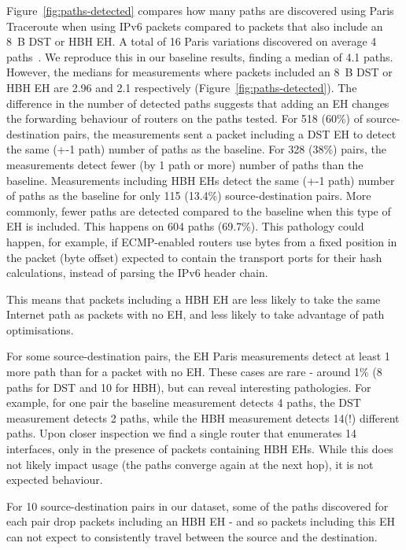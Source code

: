 \documentclass[conference]{IEEEtran}
\begin{document}
Figure~\ref{fig:paths-detected} compares how many paths are discovered using Paris Traceroute when using IPv6 packets compared to packets that also include an 8~B DST or HBH EH.
A total of 16 Paris variations discovered on average 4 paths~\cite{augustin2006avoiding}. We reproduce this in our baseline results, finding a median of 4.1 paths. However, the medians for measurements where packets included an 8~B DST or HBH EH are 2.96 and 2.1 respectively (Figure~\ref{fig:paths-detected}).
The difference in the number of detected paths suggests that adding an EH changes the forwarding behaviour of routers on the paths tested.
For 518 (60\%) of source-destination pairs, the measurements sent a packet including a DST EH to detect the same (+-1 path) number of paths as the baseline. For 328 (38\%) pairs, the measurements detect fewer (by 1 path or more) number of paths than the baseline. 
Measurements including HBH EHs detect the same (+-1 path) number of paths as the baseline for only 115 (13.4\%) source-destination pairs. More commonly, fewer paths are detected compared to the baseline when this type of EH is included. This happens on 604 paths (69.7\%). This pathology could happen, for example, if ECMP-enabled routers use bytes from a fixed position in the packet (byte offset) expected to contain the transport ports for their hash calculations, instead of parsing the IPv6 header chain. 

This means that packets including a HBH EH are less likely to take the same Internet path as packets with no EH, and less likely to take advantage of path optimisations.

For some source-destination pairs, the EH Paris measurements detect at least 1 more path than for a packet with no EH.  These cases are rare - around 1\% (8 paths for DST and 10 for HBH), but can reveal interesting pathologies.
For example, for one pair the baseline measurement detects 4 paths, the DST measurement detects 2 paths, while the HBH measurement detects 14(!) different paths. Upon closer inspection we find a single router that enumerates 14 interfaces, only in the presence of packets containing HBH EHs. While this does not likely impact usage (the paths converge again at the next hop), it is not expected behaviour.


For 10 source-destination pairs in our dataset, some of the paths discovered for each pair drop packets including an HBH EH - and so packets including this EH can not expect to consistently travel between the source and the destination. 
\end{document}
